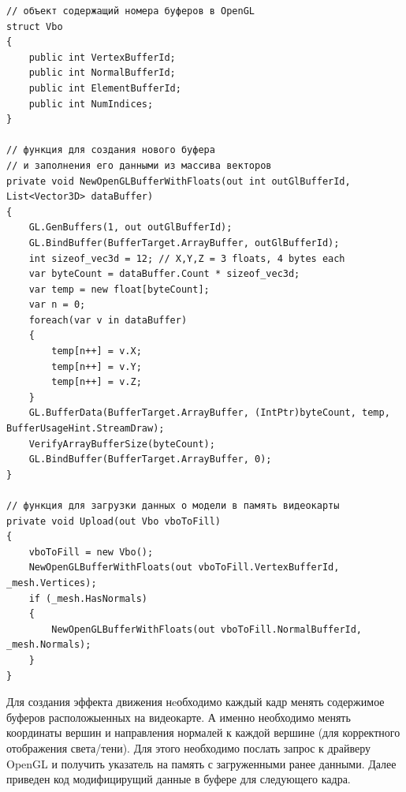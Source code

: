 \begin{verbatim}
// объект содержащий номера буферов в OpenGL
struct Vbo
{
    public int VertexBufferId;
    public int NormalBufferId;
    public int ElementBufferId;
    public int NumIndices;
}

// функция для создания нового буфера 
// и заполнения его данными из массива векторов
private void NewOpenGLBufferWithFloats(out int outGlBufferId, List<Vector3D> dataBuffer) 
{
    GL.GenBuffers(1, out outGlBufferId);
    GL.BindBuffer(BufferTarget.ArrayBuffer, outGlBufferId);
    int sizeof_vec3d = 12; // X,Y,Z = 3 floats, 4 bytes each
    var byteCount = dataBuffer.Count * sizeof_vec3d;
    var temp = new float[byteCount];
    var n = 0;
    foreach(var v in dataBuffer)
    {
        temp[n++] = v.X;
        temp[n++] = v.Y;
        temp[n++] = v.Z;
    }
    GL.BufferData(BufferTarget.ArrayBuffer, (IntPtr)byteCount, temp, BufferUsageHint.StreamDraw);
    VerifyArrayBufferSize(byteCount);
    GL.BindBuffer(BufferTarget.ArrayBuffer, 0);
}

// функция для загрузки данных о модели в память видеокарты
private void Upload(out Vbo vboToFill)
{
    vboToFill = new Vbo();    
    NewOpenGLBufferWithFloats(out vboToFill.VertexBufferId, _mesh.Vertices);
    if (_mesh.HasNormals)
    {
        NewOpenGLBufferWithFloats(out vboToFill.NormalBufferId, _mesh.Normals);
    }
}

\end{verbatim}

Для создания эффекта движения нeобходимо каждый кадр менять содержимое буферов расположыенных на видеокарте.
А именно необходимо менять координаты вершин и направления нормалей к каждой вершине (для корректного отображения света/тени).
Для этого необходимо послать запрос к драйверу OpenGL и получить указатель на память с загруженными ранее данными.
Далее приведен код модифицирущий данные в буфере для следующего кадра.

